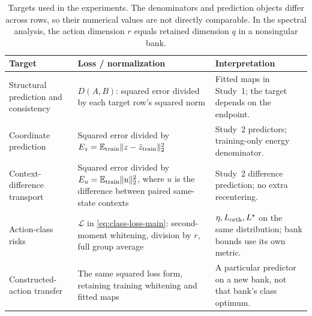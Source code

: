 \begin{table}[t]
\centering\small
\begin{tabular}{@{}p{}p{}p{}@{}}
\toprule
Target & Loss / normalization & Interpretation \\
\midrule
{\raggedright Structural prediction and consistency\par} & $D(A,B)$: squared error divided by each target row's squared norm & Fitted maps in Study~1; the target depends on the endpoint. \\
Coordinate prediction & Squared error divided by $E_z=\mathbb E_{\rm train}\|z-\bar z_{\rm train}\|_2^2$ & Study~2 predictors; training-only energy denominator. \\
{\raggedright Context-difference transport\par} & Squared error divided by $E_u=\mathbb E_{\rm train}\|u\|_2^2$, where $u$ is the difference between paired same-state contexts & Study~2 difference prediction; no extra recentering. \\
Action-class risks & $\mathcal L$ in \cref{eq:class-loss-main}: second-moment whitening, division by $r$, full group average & $\eta,L_{\rm orth},L^\star$ on the same distribution; bank bounds use its own metric. \\
{\raggedright Constructed-action transfer\par} & The same squared loss form, retaining training whitening and fitted maps & A particular predictor on a new bank, not that bank's class optimum. \\
\bottomrule
\end{tabular}
\caption{Targets used in the experiments. The denominators and prediction objects differ across rows, so their numerical values are not directly comparable. In the spectral analysis, the action dimension $r$ equals retained dimension $q$ in a nonsingular bank.}
\label{tab:metric-contract}
\end{table}
